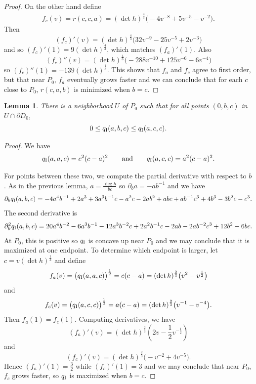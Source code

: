 \documentclass[10pt,a4paper]{amsart}
\numberwithin{equation}{section}
\newtheorem{Lemma}[Theorem]{Lemma}
\newcommand{\dvar}[1]{\partial_{#1}} %
\begin{document}
\begin{proof}
On the other hand define
\begin{gather*}
f_c(v) = r(c, c, a) = (\det h)^{\frac{4}{3}}\big({-}4 v^{-8} + 5 v^{-5} - v^{-2}\big).
\end{gather*}
Then
\[
(f_c)'(v) = (\det h)^{\frac{4}{3}}\big(32 v^{-9} - 25 v^{-5} + 2 v^{-3}\big)
\]
and so $(f_c)'(1) = 9(\det h)^{\frac{4}{3}}$, which matches $(f_a)'(1)$. Also
\[
(f_c)''(v) = (\det h)^{\frac{4}{3}}\big({-}288 v^{-10} + 125 v^{-6} - 6 v^{-4}\big)
\]
so $(f_c)''(1) = -139 (\det h)^{\frac{4}{3}}$. This shows that $f_a$ and $f_c$ agree to first order, but that near $P_0$, $f_a$ eventually grows faster and we can conclude that for each $c$ close to $P_0$, $r(c, a, b)$ is minimized when $b = c$.
\end{proof}

\begin{Lemma} \label{s3abcequalplemma}
There is a neighborhood $U$ of $P_0$ such that for all points $(0, b, c)$ in $U \cap \partial D_0$,
\[
0 \leq q_{\rm I}(a, b, c) \leq q_{\rm I}(a, c, c).
\]
\end{Lemma}

\begin{proof}
We have
\[
q_{\rm I}(a, a, c) = c^2(c - a)^2
\qquad \text{and} \qquad
q_{\rm I}(a, c, c) = a^2(c - a)^2.
\]

For points between these two, we compute the partial derivative with respect to $b$. As in the previous lemma, $a = \frac{\deg h}{bc}$ so $\dvar{b} a = -a b^{-1}$ and we have
\begin{gather*}
\dvar{b} q_{\rm I}(a, b, c) = -4a^4 b^{-1} + 2a^3 + 3a^3 b^{-1} c - a^2 c
			 - 2ab^2 + abc + ab^{-1} c^3 + 4b^3 - 3b^2c - c^3.
\end{gather*}
The second derivative is
\begin{gather*}
\dvar{b}^2 q_{\rm I}(a, b, c) = 20a^4 b^{-2} - 6a^3 b^{-1} - 12 a^3 b^{-2} c + 2a^2 b^{-1} c
		 - 2ab - 2ab^{-2} c^3 + 12 b^2 - 6bc.
\end{gather*}
At $P_0$, this is positive so $q_{\rm I}$ is concave up near $P_0$ and we may conclude that it is maximized at one endpoint. To determine which endpoint is larger, let $c = v (\det h)^{\frac{1}{3}}$ and define
\[
f_a(v) = \bigl(q_{\rm I}(a, a, c)\bigr)^{\frac{1}{2}} = c(c - a) = (\det h)^{\frac{2}{3}} \big(v^2 - v^{\frac{1}{2}}\big)
\]
and
\[
f_c(v) = \bigl(q_{\rm I}(a, c, c)\bigr)^{\frac{1}{2}} = a(c - a) = (\det h)^{\frac{2}{3}} \big(v^{-1} - v^{-4}\big).
\]
Then $f_a(1) = f_c(1)$. Computing derivatives, we have
\[
(f_a)'(v) = (\det h)^{\frac{2}{3}} \left(2v - \frac{1}{2} v^{-\frac{1}{2}}\right)
\]
and
\[
(f_c)'(v) = (\det h)^{\frac{2}{3}} \big({-}v^{-2} + 4v^{-5}\big).
\]
Hence $(f_a)'(1) = \frac{3}{2}$ while $(f_c)'(1) = 3$ and we may conclude that near $P_0$, $f_c$ grows faster, so $q_{\rm I}$ is maximized when $b = c$.
\end{proof}
\end{document}
